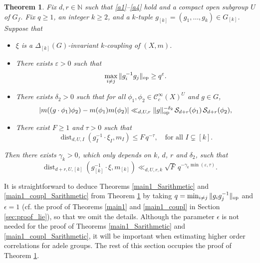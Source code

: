 \documentclass[11pt,reqno,a4paper]{amsart}
\numberwithin{equation}{section}
\newcommand{\cC}{\mathcal{C}}
\newcommand{\cS}{\mathcal{S}}
\newcommand{\bN}{\mathbb{N}}
\newcommand{\eps}{\varepsilon}
\DeclareMathOperator{\dist}{dist}
\theoremstyle{theorem}
\newtheorem{theorem}{Theorem}[section]
\theoremstyle{definition}
\begin{document}
\begin{theorem}
	\label{main1_padic}
	Fix $d,r\in\bN$ such that \eqref{a1}--\eqref{a4} hold and a compact open subgroup $U$ of $G_f$.
	Fix $q \geq 1$, an integer $k \geq 2$, and a $k$-tuple $g_{[k]} = (g_1,\ldots,g_k) \in G_{[k]}$. Suppose that
	\begin{itemize}
		\item $\xi$ is a $\Delta_{[k]}(G)$-invariant $k$-coupling of $(X,m)$.
		\item There exists $\eps > 0$ such that 
		\begin{equation}
		\label{defQ_1}
		\max_{i \neq j} \|g_i^{-1} g_j\|_{\rm op}\geq q^{\eps}.
		\end{equation}
		
		\item There exists $\delta_2>0$ such that for all $\phi_1,\phi_2\in\cC_c^\infty(X)^U$ and $g\in G$,
		\begin{equation}
		\label{KS_0}
		| m((g \cdot \phi_1) \phi_2) - m(\phi_1) m(\phi_2) | \ll_{d,U,r} \|g\|_{\rm op}^{-\delta_2} \, \cS_{d+r}(\phi_1) \, \cS_{d+r}(\phi_2), 
		\end{equation}

		
		\item There exist $F \geq 1$ and $\tau > 0$ such that
		\begin{equation}
		\label{k-1ass_1}
		\dist_{d,U,I}(g_I^{-1} \cdot \xi_I, m_I) \leq F\, q^{-\tau}, \quad \textrm{for all $I \subsetneq [k]$}.
		\end{equation}
	\end{itemize}
	Then there exists $\gamma_k > 0$, which only depends on $k$, $d$, $r$ and $\delta_2$, such that 
	\begin{equation}
	\label{conclus_1}
	\dist_{d + r,U,[k]}(g_{[k]}^{-1} \cdot \xi,m_{[k]}) \ll_{d,U,r, k} \sqrt{F} \, q^{-\gamma_k \min(\eps,\tau)}.
	\end{equation}
\end{theorem}

It is straightforward to deduce Theorems \ref{main1_Sarithmetic} and \ref{main1_coupl_Sarithmetic} from 
Theorem \ref{main1_padic} by taking $q=\min_{i\ne j} \|g_ig_j^{-1}\|_{\rm op}$ and $\epsilon=1$ (cf. 
the proof of Theorems \ref{main1} and \ref{main1_coupl} in Section \ref{sec:proof_lie}), so that we omit the details. 
Although the parameter $\epsilon$ is not needed for the proof of 
Theorems \ref{main1_Sarithmetic} and \ref{main1_coupl_Sarithmetic}, it will be important when estimating higher order correlations for adele groups. The rest of this section occupies the proof of Theorem \ref{main1_padic}.
\end{document}
